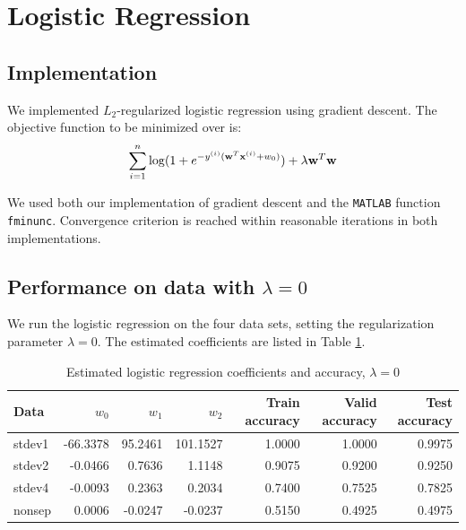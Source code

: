 
\section{Logistic Regression}\label{sec:lr}

\subsection{Implementation}
We implemented $L_2$-regularized logistic regression using gradient descent. The objective function to be minimized over is:
\begin{equation}
\sum_{i=1}^n \log (1 + e^{-y^{(i)}(\boldsymbol{\mathbf{w}}^T\boldsymbol{\mathbf{x}}^{(i)} + w_0)}) + \lambda \boldsymbol{\mathbf{w}}^T\boldsymbol{\mathbf{w}}
\end{equation}

We used both our implementation of gradient descent and the \texttt{MATLAB} function \texttt{fminunc}. Convergence criterion is reached within reasonable iterations in both implementations.

\subsection{Performance on data with $\lambda = 0$}
We run the logistic regression on the four data sets, setting the regularization parameter $\lambda = 0$. The estimated coefficients are listed in Table \ref{tab:LR_reg_coeff}.

\begin{table}[h!]
\centering
\caption{Estimated logistic regression coefficients and accuracy, $\lambda = 0$ }
\begin{tabular}{lrrrrrr}
  \hline\hline
  Data   & $w_0$ 	& $w_1$ 	  & $w_2$ 	& Train accuracy & Valid accuracy & Test accuracy\\
  \hline
  stdev1 & -66.3378  & 95.2461 & 101.1527 & 1.0000    & 1.0000    & 0.9975\\
  stdev2 & -0.0466   & 0.7636  & 1.1148 	& 0.9075    & 0.9200    & 0.9250\\
  stdev4 & -0.0093   & 0.2363  & 0.2034 	& 0.7400    & 0.7525    & 0.7825\\
  nonsep & 0.0006    & -0.0247 & -0.0237	& 0.5150    & 0.4925	   & 0.4975\\
  \hline\hline
\end{tabular}\label{tab:LR_reg_coeff}
\end{table}


